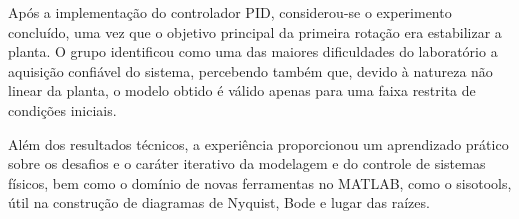 \documentclass[conference,harvard,brazil,english]{sbatex}
\begin{document}
Após a implementação do controlador PID, considerou-se o experimento concluído, uma vez que o objetivo principal da primeira rotação era estabilizar a planta. O grupo identificou como uma das maiores dificuldades do laboratório a aquisição confiável do sistema, percebendo também que, devido à natureza não linear da planta, o modelo obtido é válido apenas para uma faixa restrita de condições iniciais.

Além dos resultados técnicos, a experiência proporcionou um aprendizado prático sobre os desafios e o caráter iterativo da modelagem e do controle de sistemas físicos, bem como o domínio de novas ferramentas no MATLAB, como o sisotools, útil na construção de diagramas de Nyquist, Bode e lugar das raízes.

\nocite{*}

\cite{mozelli2020}
\cite{oliveira2011}
\cite{parks1999}
\end{document}
